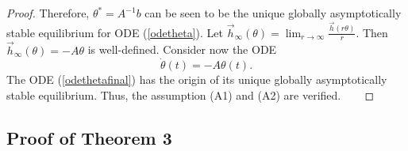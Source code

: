 \begin{proof}
 Therefore,
$\theta^*=A^{-1}b$ can be seen to be the unique globally asymptotically
 stable equilibrium for ODE (\ref{odetheta}).
 Let $\vec{h}_{\infty}(\theta)=\lim_{r\rightarrow
\infty}\frac{\vec{h}(r\theta)}{r}$. Then
$\vec{h}_{\infty}(\theta)=-A\theta$ is well-defined. 
 Consider now the ODE
\begin{equation}
 \dot{\theta}(t)=-A\theta(t).
\label{odethetafinal}
\end{equation}
 The ODE (\ref{odethetafinal}) has the origin of its unique globally asymptotically stable equilibrium.
 Thus, the assumption (A1) and (A2) are verified.
    \end{proof}

\subsection{Proof of Theorem 3}
\label{proofth2}
